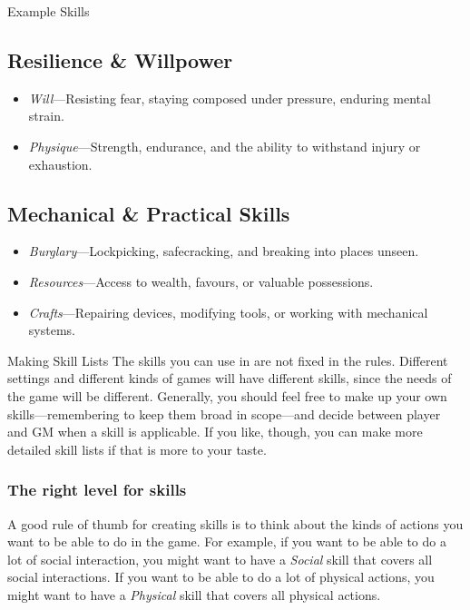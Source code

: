 \begin{multicols}{2}
\begin{CommentBox}{Example Skills}
			\subsection*{Resilience \& Willpower}
			\begin{itemize}
				\item \emph{Will}---Resisting fear, staying composed under pressure, enduring mental strain.
				\item \emph{Physique}---Strength, endurance, and the ability to withstand injury or exhaustion.
			\end{itemize}
	
			\subsection*{Mechanical \& Practical Skills}  
			\begin{itemize}
				\item \emph{Burglary}---Lockpicking, safecracking, and breaking into places unseen.
				\item \emph{Resources}---Access to wealth, favours, or valuable possessions.
				\item \emph{Crafts}---Repairing devices, modifying tools, or working with mechanical systems.
			\end{itemize}
	\end{CommentBox}


	\begin{CommentBox}{Making Skill Lists}
		The skills you can use in \wyrd are not fixed in the rules. Different settings and different kinds of games will have different skills, since the needs of the game will be different. Generally, you should feel free to make up your own skills---remembering to keep them broad in scope---and decide between player and GM when a skill is applicable. If you like, though, you can make more detailed skill lists if that is more to your taste.

		\subsubsection*{The right level for skills}
		A good rule of thumb for creating skills is to think about the kinds of actions you want to be able to do in the game. For example, if you want to be able to do a lot of social interaction, you might want to have a \emph{Social} skill that covers all social interactions. If you want to be able to do a lot of physical actions, you might want to have a \emph{Physical} skill that covers all physical actions.


\end{CommentBox}
\end{multicols}
